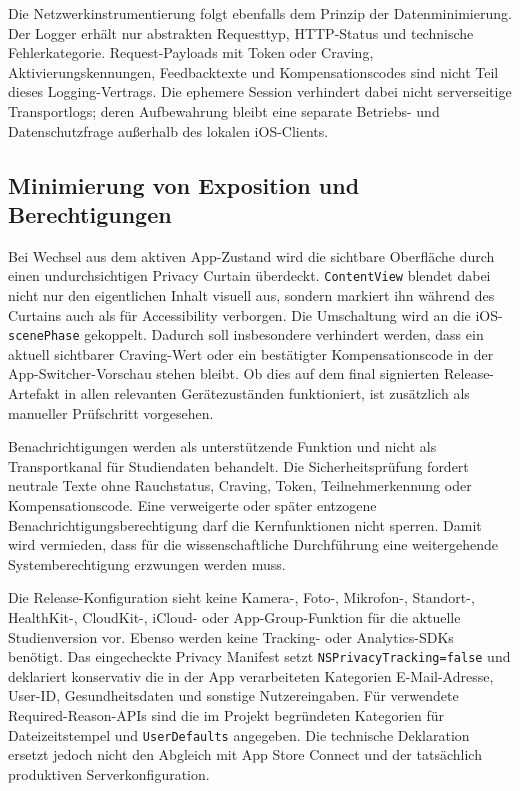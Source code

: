 \begin{neu}
Die Netzwerkinstrumentierung folgt ebenfalls dem Prinzip der Datenminimierung. Der Logger erhält nur abstrakten Requesttyp, HTTP-Status und technische Fehlerkategorie. Request-Payloads mit Token oder Craving, Aktivierungskennungen, Feedbacktexte und Kompensationscodes sind nicht Teil dieses Logging-Vertrags. Die ephemere Session verhindert dabei nicht serverseitige Transportlogs; deren Aufbewahrung bleibt eine separate Betriebs- und Datenschutzfrage außerhalb des lokalen iOS-Clients.

\subsection{Minimierung von Exposition und Berechtigungen}

Bei Wechsel aus dem aktiven App-Zustand wird die sichtbare Oberfläche durch einen undurchsichtigen Privacy Curtain überdeckt. \texttt{ContentView} blendet dabei nicht nur den eigentlichen Inhalt visuell aus, sondern markiert ihn während des Curtains auch als für Accessibility verborgen. Die Umschaltung wird an die iOS-\texttt{scenePhase} gekoppelt. Dadurch soll insbesondere verhindert werden, dass ein aktuell sichtbarer Craving-Wert oder ein bestätigter Kompensationscode in der App-Switcher-Vorschau stehen bleibt. Ob dies auf dem final signierten Release-Artefakt in allen relevanten Gerätezuständen funktioniert, ist zusätzlich als manueller Prüfschritt vorgesehen.

Benachrichtigungen werden als unterstützende Funktion und nicht als Transportkanal für Studiendaten behandelt. Die Sicherheitsprüfung fordert neutrale Texte ohne Rauchstatus, Craving, Token, Teilnehmerkennung oder Kompensationscode. Eine verweigerte oder später entzogene Benachrichtigungsberechtigung darf die Kernfunktionen nicht sperren. Damit wird vermieden, dass für die wissenschaftliche Durchführung eine weitergehende Systemberechtigung erzwungen werden muss.

Die Release-Konfiguration sieht keine Kamera-, Foto-, Mikrofon-, Standort-, HealthKit-, CloudKit-, iCloud- oder App-Group-Funktion für die aktuelle Studienversion vor. Ebenso werden keine Tracking- oder Analytics-SDKs benötigt. Das eingecheckte Privacy Manifest setzt \texttt{NSPrivacyTracking=false} und deklariert konservativ die in der App verarbeiteten Kategorien E-Mail-Adresse, User-ID, Gesundheitsdaten und sonstige Nutzereingaben. Für verwendete Required-Reason-APIs sind die im Projekt begründeten Kategorien für Dateizeitstempel und \texttt{UserDefaults} angegeben. Die technische Deklaration ersetzt jedoch nicht den Abgleich mit App Store Connect und der tatsächlich produktiven Serverkonfiguration.


\end{neu}
